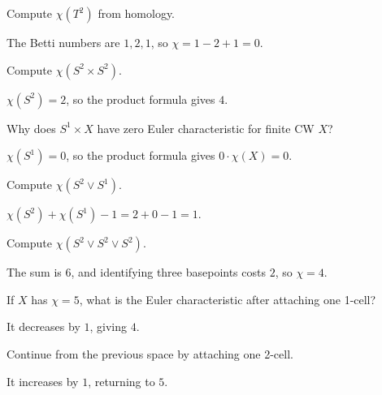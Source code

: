 \begin{problem}[Torus]\label{prob:viii21-09}
Compute \(\chi(T^2)\) from homology.
\end{problem}
\begin{solution}
The Betti numbers are \(1,2,1\), so \(\chi=1-2+1=0\).
\end{solution}

\begin{problem}\label{prob:viii21-10}
Compute \(\chi(S^2\times S^2)\).
\end{problem}
\begin{solution}
\(\chi(S^2)=2\), so the product formula gives \(4\).
\end{solution}

\begin{problem}\label{prob:viii21-11}
Why does \(S^1\times X\) have zero Euler characteristic for finite CW \(X\)?
\end{problem}
\begin{solution}
\(\chi(S^1)=0\), so the product formula gives \(0\cdot\chi(X)=0\).
\end{solution}

\begin{problem}\label{prob:viii21-12}
Compute \(\chi(S^2\vee S^1)\).
\end{problem}
\begin{solution}
\(\chi(S^2)+\chi(S^1)-1=2+0-1=1\).
\end{solution}

\begin{problem}\label{prob:viii21-13}
Compute \(\chi(S^2\vee S^2\vee S^2)\).
\end{problem}
\begin{solution}
The sum is \(6\), and identifying three basepoints costs \(2\), so \(\chi=4\).
\end{solution}

\begin{problem}\label{prob:viii21-14}
If \(X\) has \(\chi=5\), what is the Euler characteristic after attaching one 1-cell?
\end{problem}
\begin{solution}
It decreases by \(1\), giving \(4\).
\end{solution}

\begin{problem}\label{prob:viii21-15}
Continue from the previous space by attaching one 2-cell.
\end{problem}
\begin{solution}
It increases by \(1\), returning to \(5\).
\end{solution}

